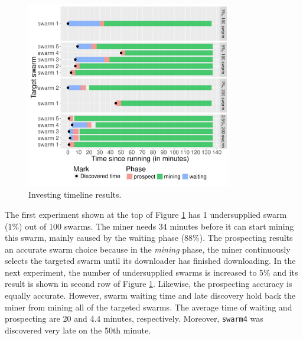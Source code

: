 \begin{figure}[th]
		\centering
		\includegraphics[width=0.8\textwidth]{pics/results/time-merge.pdf}
	\caption{Investing timeline results.}
	\label{fig:timeprosexp}
\end{figure}

The first experiment shown at the top of Figure \ref{fig:timeprosexp} has 1 undersupplied swarm (1\%) out of 100 swarms. The miner needs 34 minutes before it can start mining this swarm, mainly caused by the waiting phase (88\%). The prospecting results an accurate swarm choice because in the \textit{mining} phase, the miner continuously selects the targeted swarm until its downloader has finished downloading. In the next experiment, the number of undersupplied swarms is increased to 5\% and its result is shown in second row of Figure \ref{fig:timeprosexp}. Likewise, the prospecting accuracy is equally accurate. However, swarm waiting time and late discovery hold back the miner from mining all of the targeted swarms. The average time of waiting and prospecting are 20 and 4.4 minutes, respectively. Moreover, \texttt{swarm4} was discovered very late on the 50th minute.

